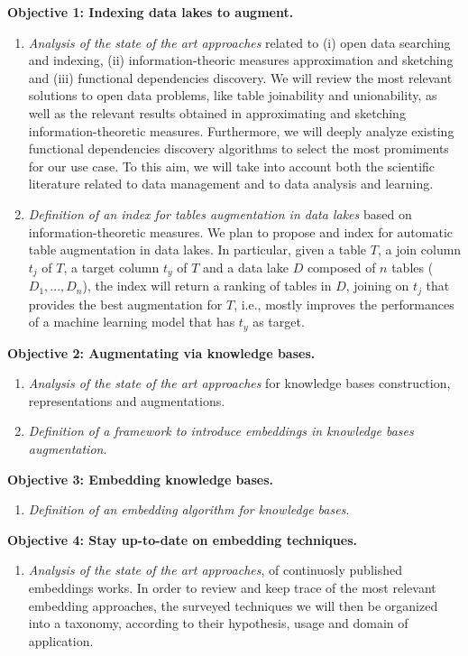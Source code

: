 \noindent\textbf{Objective 1: Indexing data lakes to augment.}
\begin{enumerate}
    \item \textit{Analysis of the state of the art approaches} related to (i) open data searching and indexing, (ii) information-theoric measures approximation and sketching and (iii) functional dependencies discovery. We will review the most relevant solutions to open data problems, like table joinability and unionability, as well as the relevant results obtained in approximating and sketching information-theoretic measures. Furthermore, we will deeply analyze existing functional dependencies discovery algorithms to select the most promiments for our use case. To this aim, we will take into account both the scientific literature related to data management and to data analysis and learning.
    \item \textit{Definition of an index for tables augmentation in data lakes} based on information-theoretic measures. We plan to propose and index for automatic table augmentation in data lakes. In particular, given a table $T$, a join column $t_j$ of $T$, a target column $t_y$ of $T$ and a data lake $D$ composed of $n$ tables ($D_1,...,D_n$), the index will return a ranking of tables in $D$, joining on $t_j$ that provides the best augmentation for $T$, i.e., mostly improves the performances of a machine learning model that has $t_y$ as target.
\end{enumerate}


\noindent\textbf{Objective 2: Augmentating via knowledge bases.}
\begin{enumerate}
    \item \textit{Analysis of the state of the art approaches} for knowledge bases construction, representations and augmentations. 
    \item \textit{Definition of a framework to introduce embeddings in knowledge bases augmentation}.
\end{enumerate}

\noindent\textbf{Objective 3: Embedding knowledge bases.}
\begin{enumerate}
    \item \textit{Definition of an embedding algorithm for knowledge bases}.
\end{enumerate}

\noindent\textbf{Objective 4: Stay up-to-date on embedding techniques.}
\begin{enumerate}
    \item \textit{Analysis of the state of the art approaches}, of continuosly published embeddings works. In order to review and keep trace of the most relevant embedding approaches, the surveyed techniques we will then be organized into a taxonomy, according to their hypothesis, usage and domain of application.
\end{enumerate}



